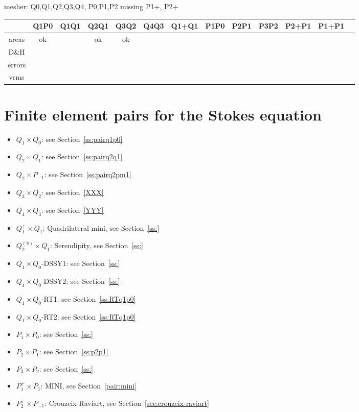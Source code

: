 mesher: Q0,Q1,Q2,Q3,Q4, P0,P1,P2   missing P1+, P2+

\begin{tabular}{ccccccccccccc}
      & Q1P0 & Q1Q1 & Q2Q1 & Q3Q2 & Q4Q3 & Q1+Q1 & P1P0 & P2P1 & P3P2 & P2+P1 & P1+P1 \\
\hline
areas  & ok & & ok & ok &&&&&& \\ 
D\&H   &  \\
errors &  \\
vrms   &  \\
\hline
\end{tabular}


\section*{Finite element pairs for the Stokes equation}

\begin{itemize}
\item $Q_1\times Q_0$: see Section~\ref{ss:pairq1p0}
\item $Q_2\times Q_1$: see Section~\ref{ss:pairq2q1}
\item $Q_2\times P_{-1}$: see Section~\ref{ss:pairq2pm1}
\item $Q_3\times Q_2$: see Section~\ref{XXX}
\item $Q_4\times Q_3$: see Section~\ref{YYY}
\item $Q_1^+\times Q_1$: Quadrilateral mini, see Section~\ref{ss:}
\item $Q_2^{(8)}\times Q_1$: Serendipity, see Section~\ref{ss:}
\item $Q_1\times Q_0$-DSSY1: see Section~\ref{ss:}
\item $Q_1\times Q_0$-DSSY2: see Section~\ref{ss:}
\item $Q_1\times Q_0$-RT1: see Section~\ref{ss:RTq1p0}
\item $Q_1\times Q_0$-RT2: see Section~\ref{ss:RTq1p0}
\item $P_1\times P_0$: see Section~\ref{ss:}
\item $P_2\times P_1$: see Section~\ref{ss:p2p1}
\item $P_3\times P_2$: see Section~\ref{ss:}
\item $P_1^{+}\times P_{1}$: MINI, see Section~\ref{pair:mini}
\item $P_2^+\times P_{-1}$: Crouzeix-Raviart, see Section~\ref{sec:crouzeix-raviart}
\end{itemize}

